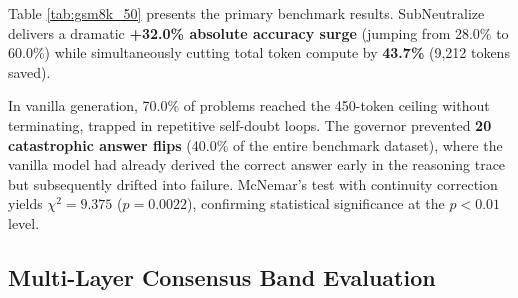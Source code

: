 \documentclass[10pt,twocolumn]{article}
\begin{document}
\begin{table}[t]
\centering
\small
\caption{Comprehensive 50-Problem GSM8K Benchmark on \texttt{DeepSeek-R1-Distill-Qwen-7B} (NVIDIA A100 GPU). Accuracy gains, compute savings, and McNemar statistical significance test.}
\label{tab:gsm8k_50}
\end{table}

Table \ref{tab:gsm8k_50} presents the primary benchmark results. SubNeutralize delivers a dramatic \textbf{+32.0\% absolute accuracy surge} (jumping from 28.0\% to 60.0\%) while simultaneously cutting total token compute by \textbf{43.7\%} (9,212 tokens saved). 

In vanilla generation, 70.0\% of problems reached the 450-token ceiling without terminating, trapped in repetitive self-doubt loops. The governor prevented \textbf{20 catastrophic answer flips} (40.0\% of the entire benchmark dataset), where the vanilla model had already derived the correct answer early in the reasoning trace but subsequently drifted into failure. McNemar's test with continuity correction yields $\chi^2 = 9.375$ ($p = 0.0022$), confirming statistical significance at the $p < 0.01$ level.

\subsection{Multi-Layer Consensus Band Evaluation}
\end{document}
